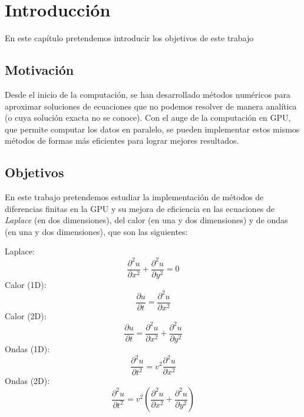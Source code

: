 \chapter{Introducción}
\label{cap:introduccion}

\begin{resumen}
	En este capítulo pretendemos introducir los objetivos de este trabajo
\end{resumen}

\section{Motivación}
Desde el inicio de la computación, se han desarrollado métodos numéricos para aproximar soluciones de ecuaciones que no podemos resolver de manera analítica (o cuya solución exacta no se conoce). Con el auge de la computación en \ac{GPU}, que permite computar los datos en paralelo, se pueden implementar estos mismos métodos de formas más eficientes para lograr mejores resultados.


\section{Objetivos}
En este trabajo pretendemos estudiar la implementación de métodos de diferencias finitas en la \ac{GPU} y su mejora de eficiencia en las ecuaciones de \emph{Laplace} (en dos dimensiones), del calor (en una y dos dimensiones) y de ondas (en una y dos dimensiones), que son las siguientes:

\begin{multicols}{3}
	\centering
	Laplace:
	\begin{equation*}
		\frac{\partial^2u}{\partial x^2}+\frac{\partial^2u}{\partial y^2}=0
	\end{equation*}
	Calor (1D):
	\begin{equation*}
		\frac{\partial u}{\partial t} = \frac{\partial ^2u}{\partial x^2} 
	\end{equation*}
Calor (2D):
	\begin{equation*}
		\frac{\partial u}{\partial t}=\frac{\partial^2u}{\partial x^2}+\frac{\partial^2u}{\partial y^2}
	\end{equation*}
Ondas (1D):
	\begin{equation*}
		\frac{\partial^2u}{\partial t^2}=v^2\frac{\partial^2u}{\partial x^2}
	\end{equation*}
Ondas (2D):
	\begin{equation*}
		\frac{\partial^2u}{\partial t^2}=v^2(\frac{\partial^2u}{\partial x^2}+\frac{\partial^2u}{\partial y^2})
	\end{equation*}
\end{multicols}



